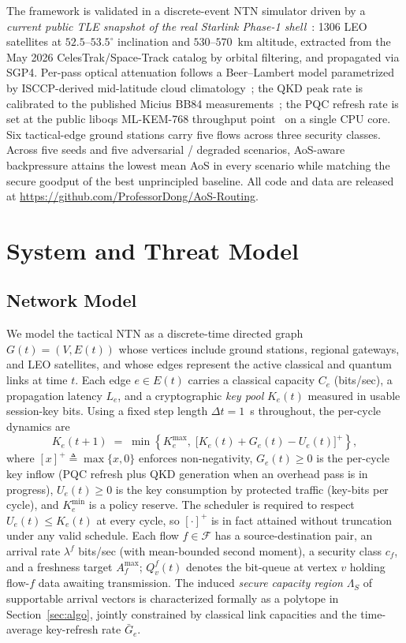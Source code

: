\documentclass[conference]{IEEEtran}
\begin{document}
The framework is validated in a discrete-event NTN simulator driven
by a \emph{current public TLE snapshot of the real Starlink Phase-1
shell}~\cite{celestrak_gp}: 1306 LEO satellites at
$52.5$--$53.5^\circ$ inclination and $530$--$570$~km altitude,
extracted from the May 2026 CelesTrak/Space-Track catalog by orbital
filtering, and propagated via SGP4.  Per-pass optical attenuation
follows a Beer--Lambert model parametrized by ISCCP-derived
mid-latitude cloud
climatology~\cite{rossow_schiffer_1999,itu_r_p1814}; the QKD
peak rate is calibrated to the published Micius BB84
measurements~\cite{liao_satellite_qkd_2017}; the PQC refresh rate is
set at the public liboqs ML-KEM-768 throughput
point~\cite{liboqs_2020} on a single CPU core.  Six tactical-edge
ground stations carry five flows across three security classes.
Across five seeds and five adversarial / degraded scenarios,
AoS-aware backpressure attains the lowest mean AoS in every scenario
while matching the secure goodput of the best unprincipled baseline.
All code and data are released at
\url{https://github.com/ProfessorDong/AoS-Routing}.

\section{System and Threat Model}
\label{sec:model}

\subsection{Network Model}
We model the tactical NTN as a discrete-time directed graph
$G(t)=(V,E(t))$ whose vertices include ground stations, regional
gateways, and LEO satellites, and whose edges represent the active
classical and quantum links at time $t$.  Each edge $e\in E(t)$
carries a classical capacity $C_e$ (bits/sec), a propagation latency
$L_e$, and a cryptographic \emph{key pool} $K_e(t)$ measured in
usable session-key bits.  Using a fixed step length $\Delta t\!=\!1$~s
throughout, the per-cycle dynamics are
\begin{equation}
 K_e(t{+}1)
 \;=\; \min\!\left\{K_e^{\max},\;
        \bigl[K_e(t) + G_e(t) - U_e(t)\bigr]^{+}\right\},
 \label{eq:keypool}
\end{equation}
where $[x]^{+}\!\triangleq\!\max\{x,0\}$ enforces non-negativity,
$G_e(t)\!\ge\!0$ is the per-cycle key inflow (PQC refresh plus QKD
generation when an overhead pass is in progress), $U_e(t)\!\ge\!0$
is the key consumption by protected traffic (key-bits per cycle),
and $K_e^{\min}$ is a policy reserve.  The scheduler is required to
respect $U_e(t)\!\le\!K_e(t)$ at every cycle, so $[\cdot]^{+}$ is in
fact attained without truncation under any valid schedule.  Each flow
$f\in\mathcal{F}$ has a source-destination pair, an arrival rate
$\lambda^f$ bits/sec (with mean-bounded second moment), a security
class $c_f$, and a freshness target $A_f^{\max}$; $Q^f_v(t)$ denotes
the bit-queue at vertex $v$ holding flow-$f$ data awaiting
transmission.  The induced \emph{secure capacity region} $\Lambda_S$
of supportable arrival vectors is characterized formally as a
polytope in Section~\ref{sec:algo}, jointly constrained by classical
link capacities and the time-average key-refresh rate $\bar G_e$.
\end{document}
